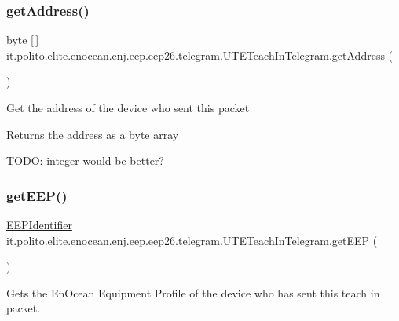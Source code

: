 \subsubsection{\texorpdfstring{get\+Address()}{getAddress()}}
{\footnotesize\ttfamily byte \mbox{[}$\,$\mbox{]} it.\+polito.\+elite.\+enocean.\+enj.\+eep.\+eep26.\+telegram.\+U\+T\+E\+Teach\+In\+Telegram.\+get\+Address (\begin{DoxyParamCaption}{ }\end{DoxyParamCaption})}

Get the address of the device who sent this packet

\begin{DoxyReturn}{Returns}
the address as a byte array \begin{DoxyVerb}    TODO: integer would be better?\end{DoxyVerb}
 
\end{DoxyReturn}
\hypertarget{classit_1_1polito_1_1elite_1_1enocean_1_1enj_1_1eep_1_1eep26_1_1telegram_1_1_u_t_e_teach_in_telegram_a8b6a859155a00edb1dc177882f802a46}{}\label{classit_1_1polito_1_1elite_1_1enocean_1_1enj_1_1eep_1_1eep26_1_1telegram_1_1_u_t_e_teach_in_telegram_a8b6a859155a00edb1dc177882f802a46} 
\subsubsection{\texorpdfstring{get\+E\+E\+P()}{getEEP()}}
{\footnotesize\ttfamily \hyperlink{classit_1_1polito_1_1elite_1_1enocean_1_1enj_1_1eep_1_1_e_e_p_identifier}{E\+E\+P\+Identifier} it.\+polito.\+elite.\+enocean.\+enj.\+eep.\+eep26.\+telegram.\+U\+T\+E\+Teach\+In\+Telegram.\+get\+E\+EP (\begin{DoxyParamCaption}{ }\end{DoxyParamCaption})}

Gets the En\+Ocean Equipment Profile of the device who has sent this teach in packet.

